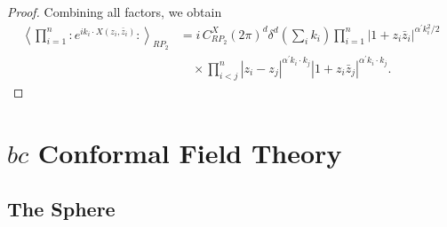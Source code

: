 \begin{tcolorbox}[breakable]
\begin{proof}
		Combining all factors, we obtain
		\begin{align}
			\left\langle\prod_{i=1}^{n}:\!e^{i k_{i}\cdot X(z_{i}, \bar z_{i})}\!:\right\rangle_{RP_{2}}
			&=
			i\,C_{RP_{2}}^{X}(2 \pi)^{d} \delta^{d}\!\left(\sum_{i} k_{i}\right)
			\prod_{i=1}^{n}|1+z_{i} \bar{z}_{i}|^{\alpha^{\prime} k_{i}^{2} / 2} \nonumber \\
			&\quad \times
			\prod_{i<j}^{n}
			|z_{i}-z_{j}|^{\alpha^{\prime} k_{i}\cdot k_{j}}
			|1+z_{i}\bar{z}_{j}|^{\alpha^{\prime} k_{i}\cdot k_{j}} .
		\end{align}
	\end{proof}
\end{tcolorbox}
\section{$bc$ Conformal Field Theory} \label{sec:6.3}

\subsection*{The Sphere}

